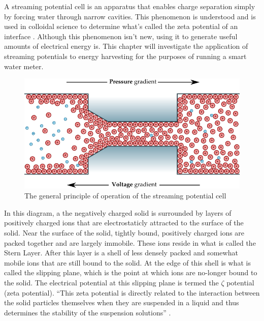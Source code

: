 A streaming potential cell is an apparatus that enables charge separation
simply by forcing water through narrow cavities. This phenomenon is
understood and is used in colloidal science to determine what's called
the zeta potential of an interface \cite{Gu2000,Scales1992,Daiguji2004,VanderHeyden2006,Mala1997}.
Although this phenomenon isn't new, using it to generate useful amounts
of electrical energy is. This chapter will investigate the application
of streaming potentials to energy harvesting for the purposes of running
a smart water meter.



\begin{figure}
\centering
\includegraphics{content/pt1/01-PowerHarvesting/graphics/streamingCellPrinciple}
\caption{\label{fig:streamingCellPrinciple}The general principle of operation of the streaming potential cell}
\end{figure}
In this diagram, a the negatively charged solid is surrounded by layers
of positively charged ions that are electrostaticly attracted to the
surface of the solid. Near the surface of the solid, tightly bound,
positively charged ions are packed together and are largely immobile.
These ions reside in what is called the Stern Layer. After this layer
is a shell of less densely packed and somewhat mobile ions that are
still bound to the solid. At the edge of this shell is what is called
the slipping plane, which is the point at which ions are no-longer
bound to the solid. The electrical potential at this slipping plane
is termed the $\zeta$ potential (zeta potential). ``This zeta potential
is directly related to the interaction between the solid particles
themselves when they are suspended in a liquid and thus determines
the stability of the suspension solutions'' \cite{Gu2000}.

